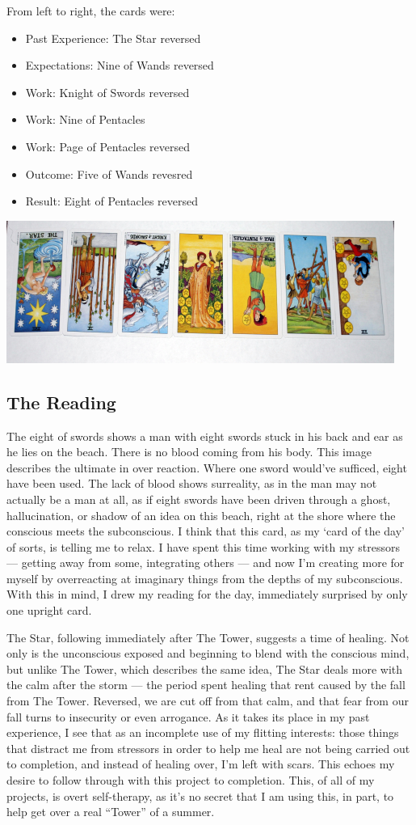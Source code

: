 From left to right, the cards were:
\begin{itemize}
  \item Past Experience: The Star reversed
  \item Expectations: Nine of Wands reversed
  \item Work: Knight of Swords reversed
  \item Work: Nine of Pentacles
  \item Work: Page of Pentacles reversed
  \item Outcome: Five of Wands revesred
  \item Result: Eight of Pentacles reversed
\end{itemize}
\includegraphics{image8-14-08.png}

\subsection*{The Reading}
The eight of swords shows a man with eight swords stuck in his back and
ear as he lies on the beach.  There is no blood coming from his body.
This image describes the ultimate in over reaction.  Where one sword
would've sufficed, eight have been used.  The lack of blood shows
surreality, as in the man may not actually be a man at all, as if eight
swords have been driven through a ghost, hallucination, or shadow of an
idea on this beach, right at the shore where the conscious meets the
subconscious.  I think that this card, as my `card of the day' of sorts,
is telling me to relax.  I have spent this time working with my
stressors --- getting away from some, integrating others --- and now I'm
creating more for myself by overreacting at imaginary things from the
depths of my subconscious.  With this in mind, I drew my reading for the
day, immediately surprised by only one upright card.

The Star, following immediately after The Tower, suggests a time of
healing.  Not only is the unconscious exposed and beginning to blend
with the conscious mind, but unlike The Tower, which describes the same
idea, The Star deals more with the calm after the storm --- the period
spent healing that rent caused by the fall from The Tower.  Reversed, we
are cut off from that calm, and that fear from our fall turns to
insecurity or even arrogance.  As it takes its place in my past
experience, I see that as an incomplete use of my flitting interests:
those things that distract me from stressors in order to help me heal
are not being carried out to completion, and instead of healing over,
I'm left with scars.  This echoes my desire to follow through with this
project to completion.  This, of all of my projects, is overt
self-therapy, as it's no secret that I am using this, in part, to help
get over a real ``Tower'' of a summer.

